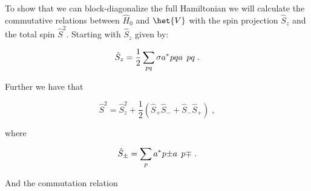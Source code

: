 To show that we can block-diagonalize the full Hamiltonian we will calculate the commutative relations between $\hat{H}_0$ and $\het{V}$ with the spin projection $\hat{S}_z$ and the total spin $\hat{S}^2$. Starting with $\hat{S}_z$ given by:

\begin{equation}
  \hat{S}_z = \frac{1}{2}\sum_{pq} \sigma \hc{a}{pq}\op{a}{pq}\; .
  \label{eq:s_z}
\end{equation}

Further we have that

\begin{equation}
  \hat{S}^2 = \hat{S}_z^2 + \frac{1}{2} \left(\hat{S}_+\hat{S}_- + \hat{S}_-\hat{S}_+\right) \; ,
  \label{eq:s_2}
\end{equation}

where

\begin{equation}
  \hat{S}_{\pm} = \sum_p \hc{a}{p\pm}\op{a}{p\mp} \; . 
  \label{eq:s_pm}
\end{equation}

And the commutation relation
